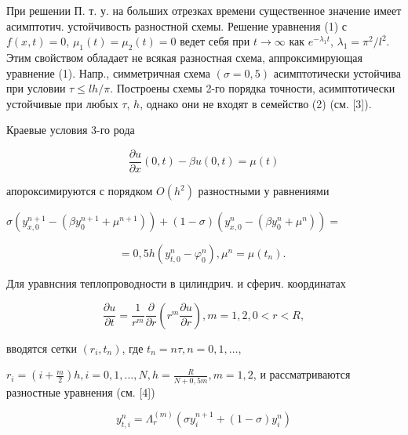 \documentclass[10pt]{article}
\begin{document}
При решении П. т. у. на больших отрезках времени существенное значение имеет асимптотич. устойчивость разностной схемы. Решение уравнения (1) с $f(x, t)=0$, $\mu_{1}(t)=\mu_{2}(t)=0$ ведет себя при $t \rightarrow \infty$ как $e^{-\lambda_{1} t}$, $\lambda_{1}=\pi^{2} / l^{2}$. Этим свойством обладает не всякая разностная схема, аппроксимирующая уравнение (1). Напр., симметричная схема $(\sigma=0,5)$ асимптотически устойчива при условии $\tau \leqslant l h / \pi$. Построены схемы 2-го порядка точности, асимптотически устойчивые при любых $\tau$, $h$, однако они не входят в семейство (2) (см. [3]).



Краевые условия 3-го рода



\[

\frac{\partial u}{\partial x}(0, t)-\beta u(0, t)=\mu(t)

\]



апороксимируются с порядком $O\left(h^{2}\right)$ разностными у равнениями



$\sigma\left(y_{x, 0}^{n+1}-\left(\beta y_{0}^{n+1}+\mu^{n+1}\right)\right)+(1-\sigma)\left(y_{x, 0}^{n}-\left(\beta y_{0}^{n}+\mu^{n}\right)\right)=$



\[

=0,5 h\left(y_{t, 0}^{n}-\varphi_{0}^{n}\right), \mu^{n}=\mu\left(t_{n}\right) \text {. }

\]



Для уравнсния теплопроводности в цилиндрич. и сферич. координатах



\[

\frac{\partial u}{\partial t}=\frac{1}{r^{m}} \frac{\partial}{\partial r}\left(r^{m} \frac{\partial u}{\partial r}\right), m=1,2,0<r<R,

\]



вводятся сетки $\left(r_{i}, t_{n}\right)$, где $t_{n}=n \tau, n=0,1, \ldots$,



$r_{i}=\left(i+\frac{m}{2}\right) h, i=0,1, \ldots, N, h=\frac{R}{N+0,5 m}, m=1,2$, и рассматриваются разностные уравнения (см. [4])



\[

y_{t, i}^{n}=\Lambda_{r}^{(m)}\left(\sigma y_{i}^{n+1}+(1-\sigma) y_{i}^{n}\right)

\]
\end{document}
